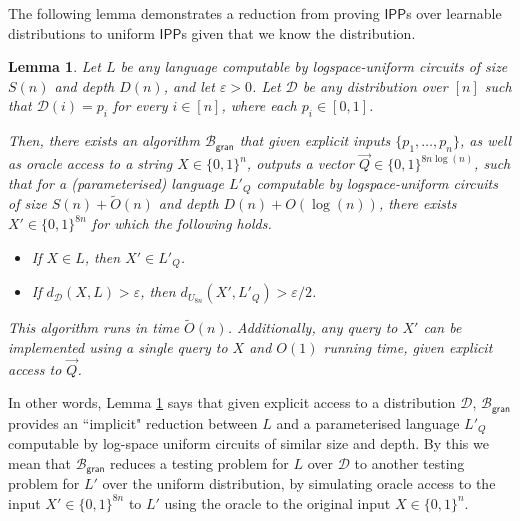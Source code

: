 \documentclass[10pt,a4paper]{article}
\newtheorem{lemma}[theorem]{Lemma}
\newcommand{\IPP}{\mathsf{IPP}}
\newcommand{\gran}{\mathsf{gran}}
\newcommand{\sD}{\mathcal{D}}
\newcommand{\sB}{\mathcal{B}}
\begin{document}
The following lemma demonstrates a reduction from proving $\IPP$s over learnable distributions to uniform $\IPP$s given that we know the distribution. 

\begin{lemma}
\label{lem:make_uniform_oracle}
Let $L$ be any language computable by logspace-uniform circuits of size $S(n)$ and depth $D(n)$, and let $\varepsilon > 0$. Let $\sD$ be any distribution over $[n]$ such that $\sD(i) = p_i$ for every $i \in [n]$, where each $p_i \in [0,1]$.

Then, there exists an algorithm $\sB_\gran$ that given explicit inputs $\{p_1, \dots, p_n \}$, as well as oracle access to a string $X\in \{0,1\}^{n}$, outputs a vector $\vec{Q} \in \{0,1\}^{8n \log (n)}$, such that for a (parameterised) language $L'_{Q}$ computable by logspace-uniform circuits of size $S(n)+\tilde{O}(n)$ and depth $D(n)+O(\log (n))$, there exists $X'\in \{0,1\}^{8n}$ for which the following holds.
\begin{itemize}
        \item If $X \in L$, then $X' \in L'_Q$.
        \item If $d_\sD (X,L) > \varepsilon$, then $d_{U_{8n}} (X',L'_Q) > \varepsilon/2$.
    \end{itemize}

This algorithm runs in time $\tilde{O}(n)$. Additionally, any query to $X'$ can be implemented using a single query to $X$ and $O(1)$ running time, given explicit access to $\vec{Q}$.
\end{lemma}

In other words, Lemma \ref{lem:make_uniform_oracle} says that given explicit access to a distribution $\sD$, $\sB_\gran$ provides an ``implicit" reduction between  $L$ and a parameterised language $L'_Q$ computable by log-space uniform circuits of similar size and depth. By this we mean that $\sB_\gran$ reduces a testing problem for $L$ over $\sD$ to another testing problem for $L'$ over the uniform distribution, by simulating oracle access to the input $X' \in \{0,1\}^{8n}$ to $L'$ using the oracle to the original input $X \in \{0,1\}^n$.
\end{document}
